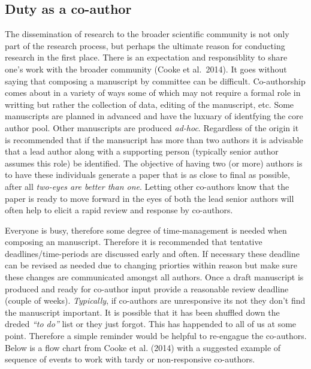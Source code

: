 \documentclass[]{article}
\begin{document}
\hypertarget{duty-as-a-co-author}{%
\subsection{\texorpdfstring{\textbf{Duty as a
co-author}}{Duty as a co-author}}\label{duty-as-a-co-author}}

The dissemination of research to the broader scientific community is not
only part of the research process, but perhaps the ultimate reason for
conducting research in the first place. There is an expectation and
responsiblity to share one's work with the broader community (Cooke et
al.~2014). It goes without saying that composing a manuscript by
committee can be difficult. Co-authorship comes about in a variety of
ways some of which may not require a formal role in writting but rather
the collection of data, editing of the manuscript, etc. Some manuscripts
are planned in advanced and have the luxuary of identfying the core
author pool. Other manuscripts are produced \emph{ad-hoc}. Regardless of
the origin it is recommended that if the mansucript has more than two
authors it is advisable that a lead author along with a supporting
person (typically senior author assumes this role) be identified. The
objective of having two (or more) authors is to have these individuals
generate a paper that is as close to final as possible, after all
\emph{two-eyes are better than one}. Letting other co-authors know that
the paper is ready to move forward in the eyes of both the lead senior
authors will often help to elicit a rapid review and response by
co-authors.

Everyone is busy, therefore some degree of time-management is needed
when composing an manuscript. Therefore it is recommended that tentative
deadlines/time-periods are discussed early and often. If necessary these
deadline can be revised as needed due to changing priorties within
reason but make sure these changes are communicated amongst all authors.
Once a draft manuscript is produced and ready for co-author input
provide a reasonable review deadline (couple of weeks).
\emph{Typically}, if co-authors are unresponsive its not they don't find
the manuscript important. It is possible that it has been shuffled down
the dreded \emph{``to do''} list or they just forgot. This has happended
to all of us at some point. Therefore a simple reminder would be helpful
to re-engague the co-authors. Below is a flow chart from Cooke et al.
(2014) with a suggested example of sequence of events to work with tardy
or non-responsive co-authors.
\end{document}
